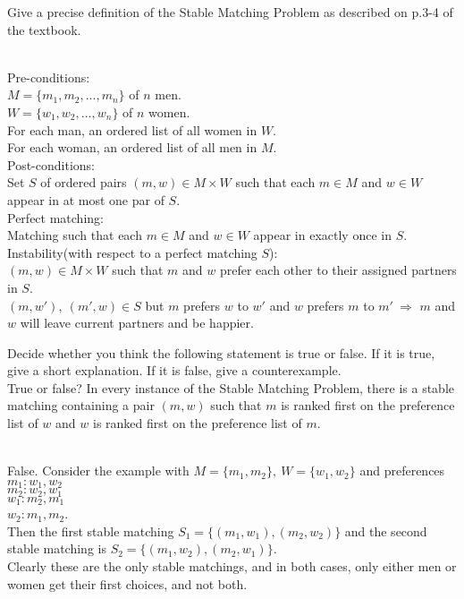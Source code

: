 \documentclass{assignment}
\begin{document}
\begin{problemlist}

\pbitem
\begin{problem}
Give a precise definition of the Stable Matching Problem as described on p.3-4 of the textbook.
\end{problem}
\begin{answer}
\\Pre-conditions: \\
$M=\{m_1,m_2,...,m_n\}$ of $n$ men.\\
$W=\{w_1,w_2,...,w_n\}$ of $n$ women.\\
For each man, an ordered list of all women in $W$.\\
For each woman, an ordered list of all men in $M$.\\
Post-conditions:\\
Set $S$ of ordered pairs $(m,w)\in M \times W$ such that each $m\in M$ and $w\in W$ appear in at most one par of $S$.\\
Perfect matching: \\
Matching such that each $m\in M$ and $w\in W$ appear in exactly once in $S$.\\
Instability(with respect to a perfect matching $S$):\\
$(m,w)\in M\times W$ such that $m$ and $w$ prefer each other to their assigned partners in $S$.\\
$(m,w'),~(m',w)\in S$ but $m$ prefers $w$ to $w'$ and $w$ prefers $m$ to $m'~\Rightarrow$ $m$ and $w$ will leave current partners and be happier.
\end{answer}

\pbitem
\begin{problem}
Decide whether you think the following statement is true or false. If it is true, give a short explanation. If it is false, give a counterexample.\\
True or false? In every instance of the Stable Matching Problem, there is a stable matching containing a pair $(m,w)$ such that $m$ is ranked first on the preference list of $w$ and $w$ is ranked first on the preference list of $m$.
\end{problem}
\begin{answer}
\\False. Consider the example with $M=\{m_1,m_2\},~W=\{w_1,w_2\}$ and preferences $m_1:w_1,w_2$\\$m_2:w_2,w_1$\\$w_1:m_2,m_1$\\$w_2:m_1,m_2$.\\
Then the first stable matching $S_1=\{(m_1,w_1),(m_2,w_2)\}$ and the second stable matching is $S_2=\{(m_1,w_2),(m_2,w_1)\}$.\\
Clearly these are the only stable matchings, and in both cases, only either men or women get their first choices, and not both.
\end{answer}


\end{problemlist}
\end{document}
